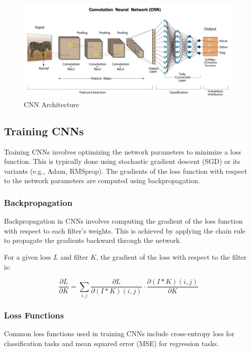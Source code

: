 \documentclass[12pt]{article}
\begin{document}
\begin{figure}[h]
    \centering
    \includegraphics[scale=0.3]{./media/cnn.jpeg}
    \caption{CNN Architecture}
    \label{fig:cnn_arch}
\end{figure}

\subsection{Training CNNs}

Training CNNs involves optimizing the network parameters to minimize a loss function. This is typically done using stochastic gradient descent (SGD) or its variants (e.g., Adam, RMSprop). The gradients of the loss function with respect to the network parameters are computed using backpropagation.

\subsubsection{Backpropagation}

Backpropagation in CNNs involves computing the gradient of the loss function with respect to each filter's weights. This is achieved by applying the chain rule to propagate the gradients backward through the network.

For a given loss \( L \) and filter \( K \), the gradient of the loss with respect to the filter is:

\[
\frac{\partial L}{\partial K} = \sum_{i, j} \frac{\partial L}{\partial (I * K)(i, j)} \cdot \frac{\partial (I * K)(i, j)}{\partial K}
\]

\subsubsection{Loss Functions}

Common loss functions used in training CNNs include cross-entropy loss for classification tasks and mean squared error (MSE) for regression tasks.
\end{document}
